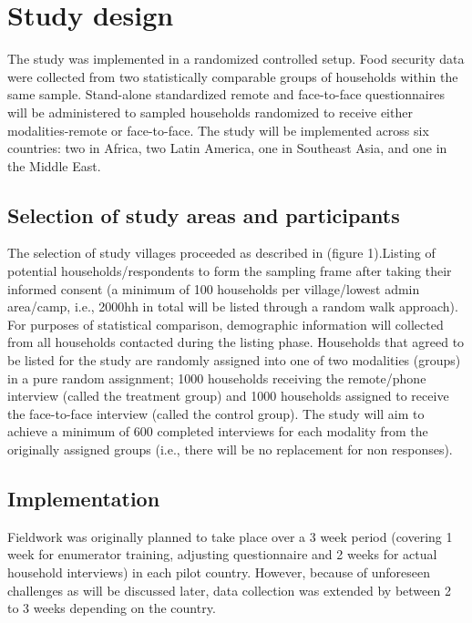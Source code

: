 \documentclass[11pt,harvard]{article}
\begin{document}
\pagebreak

\section{Study design}

The study was implemented in a randomized controlled setup. 
Food security data were collected from two statistically comparable groups of households within the same sample. Stand-alone standardized remote and face-to-face questionnaires will be administered to sampled households randomized to receive either modalities-remote or face-to-face. The study will be implemented across six countries: two in Africa, two Latin America, one in Southeast Asia, and one in the Middle East. 

	\subsection{Selection of study areas and participants}
	
The selection of study villages proceeded as described in (figure 1).Listing of potential households/respondents to form the sampling frame after taking their informed consent (a minimum of 100 households per village/lowest admin area/camp, i.e., 2000hh in total will be listed through a random walk approach). For purposes of statistical comparison, demographic information will collected from all households contacted during the listing phase. Households that agreed to be listed for the study are randomly assigned into one of two modalities (groups) in a pure random assignment; 1000 households receiving the remote/phone interview (called the treatment group) and 1000 households assigned to receive the face-to-face interview (called the control group). 
The study will aim to achieve a minimum of 600 completed interviews for each modality from the originally assigned groups (i.e., there will be no replacement for non responses).  

	\subsection{Implementation}

Fieldwork was originally planned to take place over a 3 week period (covering 1 week for enumerator training, adjusting questionnaire and 2 weeks for actual household interviews) in each pilot country. However, because of unforeseen challenges as will be discussed later, data collection was extended by between 2 to 3 weeks depending on the country.
\end{document}
